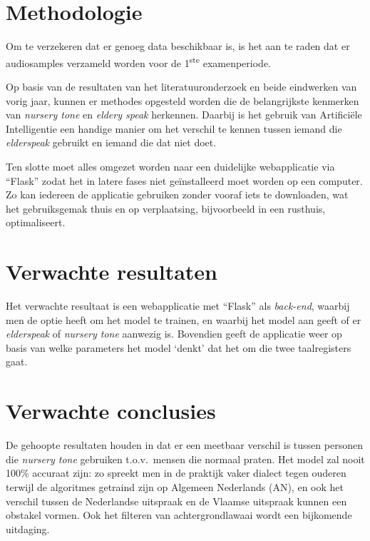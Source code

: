 \section{Methodologie}
\label{sec:methodologie}

Om te verzekeren dat er genoeg data beschikbaar is, is het aan te raden dat er audiosamples verzameld worden voor de 1\textsuperscript{ste} examenperiode.

Op basis van de resultaten van het literatuuronderzoek en beide eindwerken van vorig jaar, kunnen er methodes opgesteld worden die de belangrijkste kenmerken van \textit{nursery tone} en \textit{eldery speak} herkennen.
Daarbij is het gebruik van Artificiële Intelligentie een handige manier om het verschil te kennen tussen iemand die \textit{elderspeak} gebruikt en iemand die dat niet doet.

Ten slotte moet alles omgezet worden naar een duidelijke webapplicatie via ``Flask'' zodat het in latere fases niet geïnstalleerd moet worden op een computer. Zo kan iedereen de applicatie gebruiken zonder vooraf iets te downloaden, wat het gebruiksgemak thuis en op verplaatsing, bijvoorbeeld in een rusthuis, optimaliseert.


\section{Verwachte resultaten}
\label{sec:verwachte_resultaten}

Het verwachte resultaat is een webapplicatie met ``Flask'' als \textit{back-end}, waarbij men de optie heeft om het model te trainen, en waarbij het model aan geeft of er \textit{elderspeak} of \textit{nursery tone} aanwezig is. Bovendien geeft de applicatie weer op basis van welke parameters het model `denkt' dat het om die twee taalregisters gaat.

\section{Verwachte conclusies}
\label{sec:verwachte_conclusies}

De gehoopte resultaten houden in dat er een meetbaar verschil is tussen personen die \textit{nursery tone} gebruiken t.o.v.\ mensen die normaal praten.
Het model zal nooit 100\% accuraat zijn: zo spreekt men in de praktijk vaker dialect tegen ouderen terwijl de algoritmes getraind zijn op Algemeen Nederlands (AN), en ook het verschil tussen de Nederlandse uitspraak en de Vlaamse uitspraak kunnen een obstakel vormen.
Ook het filteren van achtergrondlawaai wordt een bijkomende uitdaging.

